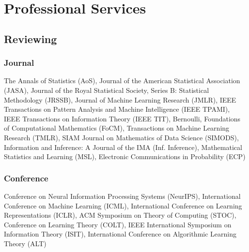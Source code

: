 \documentclass[10pt, a4paper]{article}
\begin{document}
\section*{\textbf{Professional Services}}

\subsection*{\textbf{Reviewing}}

\subsubsection*{Journal} The Annals of Statistics (AoS), Journal of the American Statistical Association (JASA), Journal of the Royal Statistical Society, Series B: Statistical Methodology (JRSSB), Journal of Machine Learning Research (JMLR), IEEE Transactions on Pattern Analysis and Machine Intelligence (IEEE TPAMI), IEEE Transactions on Information Theory (IEEE TIT), Bernoulli, Foundations of Computational Mathematics (FoCM), Transactions on Machine Learning Research (TMLR), SIAM Journal on Mathematics of Data Science (SIMODS), Information and Inference: A Journal of the IMA (Inf. Inference), Mathematical Statistics and Learning (MSL), Electronic Communications in Probability (ECP)

\subsubsection*{Conference} Conference on Neural Information Processing Systems (NeurIPS), International Conference on Machine Learning (ICML), International Conference on Learning Representations (ICLR), ACM Symposium on Theory of Computing (STOC), Conference on Learning Theory (COLT), IEEE International Symposium on Information Theory (ISIT), International Conference on Algorithmic Learning Theory (ALT)
\end{document}
